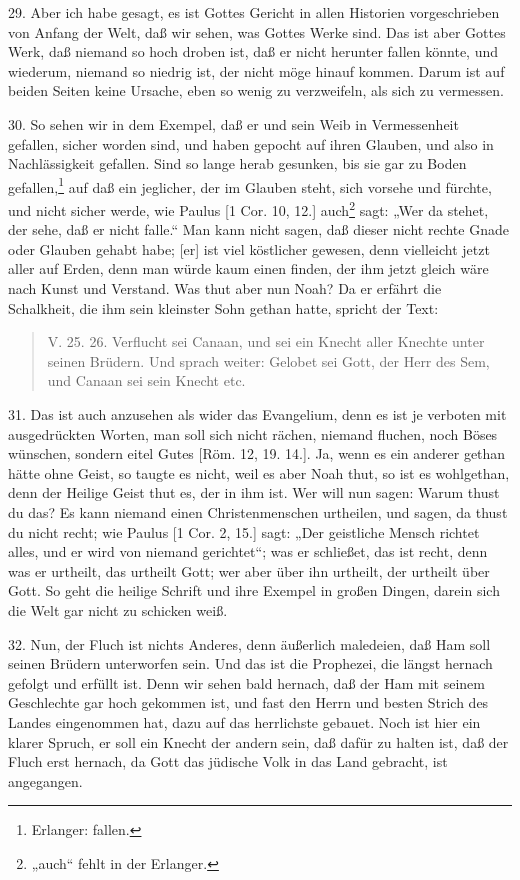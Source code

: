 29. Aber ich habe gesagt, es ist Gottes Gericht in allen Historien vorgeschrieben von Anfang der Welt, daß wir sehen, was Gottes Werke sind. Das ist aber Gottes Werk, daß niemand so hoch droben ist, daß er nicht herunter fallen könnte, und wiederum, niemand so niedrig ist, der nicht möge hinauf kommen. Darum ist auf beiden Seiten keine Ursache, eben so wenig zu verzweifeln, als sich zu vermessen.

30. So sehen wir in dem Exempel, daß er und sein Weib in Vermessenheit gefallen, sicher worden sind, und haben gepocht auf ihren Glauben, und also in Nachlässigkeit gefallen. Sind so lange herab gesunken, bis sie gar zu Boden gefallen,\footnote{Erlanger: fallen.} auf daß ein jeglicher, der im Glauben steht, sich vorsehe und fürchte, und nicht sicher werde, wie Paulus [1 Cor. 10, 12.] auch\footnote{„auch“ fehlt in der Erlanger.} sagt: „Wer da stehet, der sehe, daß er nicht falle.“ Man kann nicht sagen, daß dieser nicht rechte Gnade oder Glauben gehabt habe; [er] ist viel köstlicher gewesen, denn vielleicht jetzt aller auf Erden, denn man würde kaum einen finden, der ihm jetzt gleich wäre nach Kunst und Verstand. Was thut aber nun Noah? Da er erfährt die Schalkheit, die ihm sein kleinster Sohn gethan hatte, spricht der Text:

\begin{quote}
V. 25. 26. Verflucht sei Canaan, und sei ein Knecht aller Knechte unter seinen Brüdern. Und sprach weiter: Gelobet sei Gott, der Herr des Sem, und Canaan sei sein Knecht etc.
\end{quote}

31. Das ist auch anzusehen als wider das Evangelium, denn es ist je verboten mit ausgedrückten Worten, man soll sich nicht rächen, niemand fluchen, noch Böses wünschen, sondern eitel Gutes [Röm. 12, 19. 14.]. Ja, wenn es ein anderer gethan hätte ohne Geist, so taugte es nicht, weil es aber Noah thut, so ist es wohlgethan, denn der Heilige Geist thut es, der in ihm ist. Wer will nun sagen: Warum thust du das? Es kann niemand einen Christenmenschen urtheilen, und sagen, da thust du nicht recht; wie Paulus [1 Cor. 2, 15.] sagt: „Der geistliche Mensch richtet alles, und er wird von niemand gerichtet“; was er schließet, das ist recht, denn was er urtheilt, das urtheilt Gott; wer aber über ihn urtheilt, der urtheilt über Gott. So geht die heilige Schrift und ihre Exempel in großen Dingen, darein sich die Welt gar nicht zu schicken weiß.

32. Nun, der Fluch ist nichts Anderes, denn äußerlich maledeien, daß Ham soll seinen Brüdern unterworfen sein. Und das ist die Prophezei, die längst hernach gefolgt und erfüllt ist. Denn wir sehen bald hernach, daß der Ham mit seinem Geschlechte gar hoch gekommen ist, und fast den Herrn und besten Strich des Landes eingenommen hat, dazu auf das herrlichste gebauet. Noch ist hier ein klarer Spruch, er soll ein Knecht der andern sein, daß dafür zu halten ist, daß der Fluch erst hernach, da Gott das jüdische Volk in das Land gebracht, ist angegangen.

